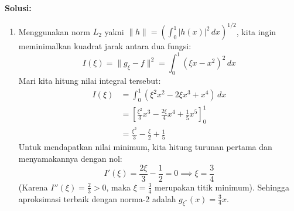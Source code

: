 \documentclass[12pt]{article}
\begin{document}
\begin{enumerate}
            \textbf{Solusi:}
            \begin{enumerate}
                  \item Menggunakan norm $L_2$ yakni $\|h\| = \left( \int_0^1 |h(x)|^2 \, dx \right)^{1/2}$, kita ingin meminimalkan kuadrat jarak antara dua fungsi:
                        $$ I(\xi) = \|g_\xi - f\|^2 = \int_0^1 (\xi x - x^2)^2 \, dx $$
                        Mari kita hitung nilai integral tersebut:
                        \begin{align*}
                              I(\xi) & = \int_0^1 (\xi^2 x^2 - 2\xi x^3 + x^4) \, dx                                \\
                                     & = \left[ \frac{\xi^2}{3}x^3 - \frac{2\xi}{4}x^4 + \frac{1}{5}x^5 \right]_0^1 \\
                                     & = \frac{\xi^2}{3} - \frac{\xi}{2} + \frac{1}{5}
                        \end{align*}
                        Untuk mendapatkan nilai minimum, kita hitung turunan pertama dan menyamakannya dengan nol:
                        $$ I'(\xi) = \frac{2\xi}{3} - \frac{1}{2} = 0 \implies \xi = \frac{3}{4} $$
                        (Karena $I''(\xi) = \frac{2}{3} > 0$, maka $\xi = \frac{3}{4}$ merupakan titik minimum).
                        Sehingga aproksimasi terbaik dengan norma-2 adalah $g_{\xi^*}(x) = \frac{3}{4}x$.


\end{enumerate}
\end{enumerate}
\end{document}
